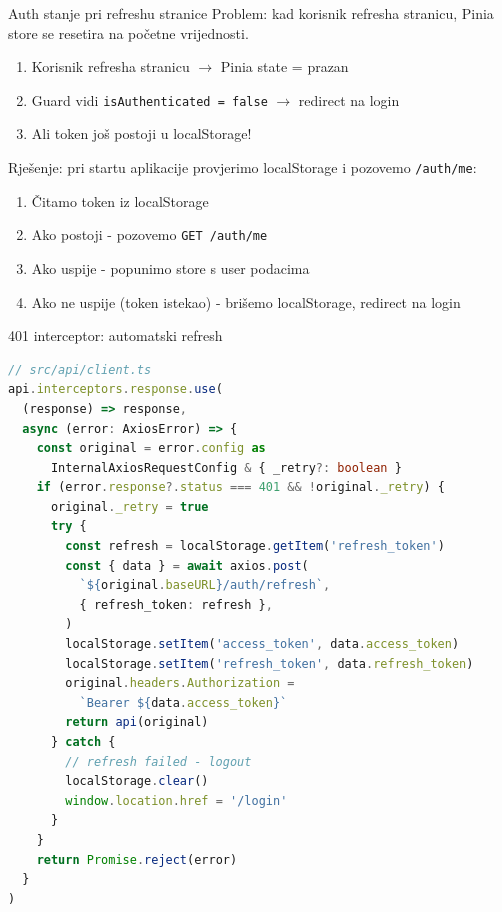 \begin{frame}{Auth stanje pri refreshu stranice}
Problem: kad korisnik refresha stranicu, Pinia store se resetira na početne vrijednosti.

\vspace{0.6em}
\begin{enumerate}
  \item Korisnik refresha stranicu $\rightarrow$ Pinia state = prazan
  \item Guard vidi \texttt{isAuthenticated = false} $\rightarrow$ redirect na login
  \item Ali token još postoji u localStorage!
\end{enumerate}

\vspace{0.6em}
Rješenje: pri startu aplikacije provjerimo localStorage i pozovemo \texttt{/auth/me}:
\begin{enumerate}
  \item Čitamo token iz localStorage
  \item Ako postoji - pozovemo \texttt{GET /auth/me}
  \item Ako uspije - popunimo store s user podacima
  \item Ako ne uspije (token istekao) - brišemo localStorage, redirect na login
\end{enumerate}
\end{frame}

\begin{frame}[fragile,shrink=5]{401 interceptor: automatski refresh}
\begin{lstlisting}[language=typescript]
// src/api/client.ts
api.interceptors.response.use(
  (response) => response,
  async (error: AxiosError) => {
    const original = error.config as
      InternalAxiosRequestConfig & { _retry?: boolean }
    if (error.response?.status === 401 && !original._retry) {
      original._retry = true
      try {
        const refresh = localStorage.getItem('refresh_token')
        const { data } = await axios.post(
          `${original.baseURL}/auth/refresh`,
          { refresh_token: refresh },
        )
        localStorage.setItem('access_token', data.access_token)
        localStorage.setItem('refresh_token', data.refresh_token)
        original.headers.Authorization =
          `Bearer ${data.access_token}`
        return api(original)
      } catch {
        // refresh failed - logout
        localStorage.clear()
        window.location.href = '/login'
      }
    }
    return Promise.reject(error)
  }
)
\end{lstlisting}
\end{frame}

